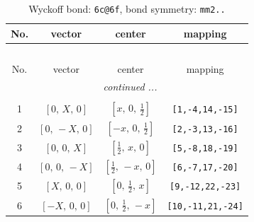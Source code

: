 \documentclass[fleqn,8pt]{jsarticle}
\begin{document}
\begin{longtable}{cccc}
\caption{Wyckoff bond: {\tt 6c@6f}, bond symmetry: {\tt mm2..}}
 \\
 \hline \hline
No. & vector & center & mapping \\ \hline \endfirsthead

\multicolumn{3}{l}{\tablename\ \thetable{}} \\
 \hline \hline
No. & vector & center & mapping \\ \hline \endhead

 \hline \hline
\multicolumn{3}{r}{\footnotesize\it continued ...} \\ \endfoot

 \hline \hline
\multicolumn{3}{r}{} \\ \endlastfoot

1 & $\left[ 0,\, X,\, 0 \right]$ & $\left[ x,\, 0,\, \frac{1}{2} \right]$ & {\tt [1,-4,14,-15]} \\ \hline
2 & $\left[ 0,\, - X,\, 0 \right]$ & $\left[ - x,\, 0,\, \frac{1}{2} \right]$ & {\tt [2,-3,13,-16]} \\ \hline
3 & $\left[ 0,\, 0,\, X \right]$ & $\left[ \frac{1}{2},\, x,\, 0 \right]$ & {\tt [5,-8,18,-19]} \\ \hline
4 & $\left[ 0,\, 0,\, - X \right]$ & $\left[ \frac{1}{2},\, - x,\, 0 \right]$ & {\tt [6,-7,17,-20]} \\ \hline
5 & $\left[ X,\, 0,\, 0 \right]$ & $\left[ 0,\, \frac{1}{2},\, x \right]$ & {\tt [9,-12,22,-23]} \\ \hline
6 & $\left[ - X,\, 0,\, 0 \right]$ & $\left[ 0,\, \frac{1}{2},\, - x \right]$ & {\tt [10,-11,21,-24]} \\
\end{longtable}
\renewcommand{\arraystretch}{1.2}
\end{document}
